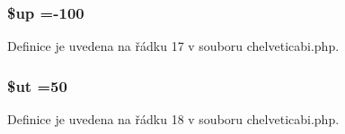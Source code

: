 \hypertarget{chelveticabi_8php_a6b5ad2ac55f9df46e8f34e78fbd6f176}{
\subsubsection[{\$up}]{\setlength{\rightskip}{0pt plus 5cm}\$up =-\/100}}\label{chelveticabi_8php_a6b5ad2ac55f9df46e8f34e78fbd6f176}


Definice je uvedena na řádku 17 v souboru chelveticabi.\-php.

\hypertarget{chelveticabi_8php_aadd3f841051043ee58e587e840e8dd0b}{
\subsubsection[{\$ut}]{\setlength{\rightskip}{0pt plus 5cm}\$ut =50}}\label{chelveticabi_8php_aadd3f841051043ee58e587e840e8dd0b}


Definice je uvedena na řádku 18 v souboru chelveticabi.\-php.

